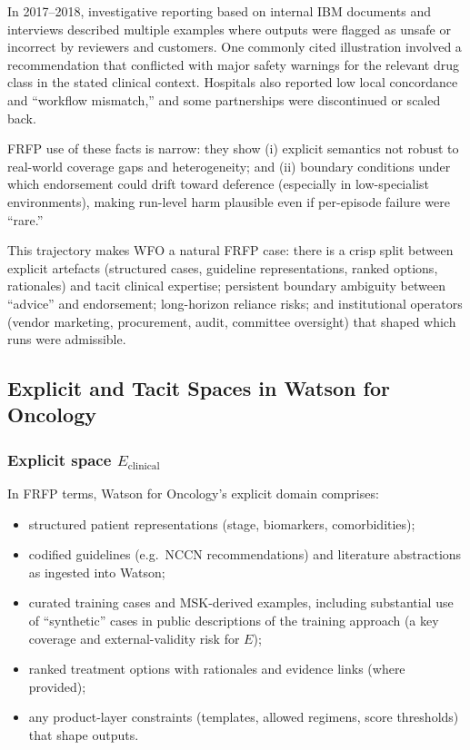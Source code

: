 In 2017--2018, investigative reporting based on internal IBM documents and interviews described
multiple examples where outputs were flagged as unsafe or incorrect by reviewers and customers.
One commonly cited illustration involved a recommendation that conflicted with major safety warnings
for the relevant drug class in the stated clinical context. Hospitals also reported low local concordance
and “workflow mismatch,” and some partnerships were discontinued or scaled back.

FRFP use of these facts is narrow: they show (i) explicit semantics not robust to real-world coverage
gaps and heterogeneity; and (ii) boundary conditions under which endorsement could drift toward
deference (especially in low-specialist environments), making run-level harm plausible even if
per-episode failure were “rare.”

This trajectory makes WFO a natural FRFP case: there is a crisp split between explicit artefacts
(structured cases, guideline representations, ranked options, rationales) and tacit clinical expertise;
persistent boundary ambiguity between “advice” and endorsement; long-horizon reliance risks; and
institutional operators (vendor marketing, procurement, audit, committee oversight) that shaped
which runs were admissible.

\subsection{Explicit and Tacit Spaces in Watson for Oncology}

\subsubsection*{Explicit space \(E_{\mathrm{clinical}}\)}

In FRFP terms, Watson for Oncology’s explicit domain comprises:

\begin{itemize}
  \item structured patient representations (stage, biomarkers, comorbidities);
  \item codified guidelines (e.g.\ NCCN recommendations) and literature
        abstractions as ingested into Watson;
  \item curated training cases and MSK-derived examples, including substantial use of “synthetic”
        cases in public descriptions of the training approach (a key coverage and external-validity
        risk for \(E\));
   \item ranked treatment options with rationales and evidence links (where provided);
   \item any product-layer constraints (templates, allowed regimens, score thresholds) that shape outputs.
 \end{itemize}
